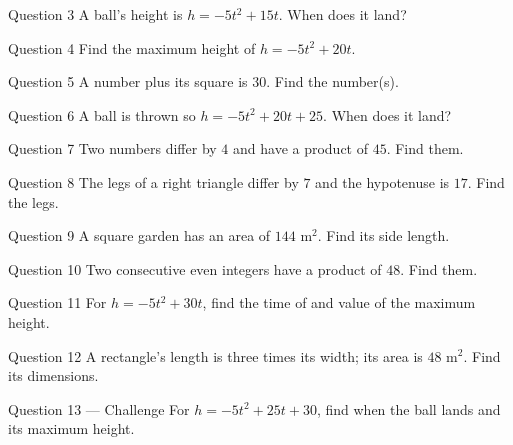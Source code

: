 \documentclass[11pt]{article}
\begin{document}
\begin{qbox}{Question 3}
A ball's height is $h=-5t^2+15t$. When does it land?\workspace{2.4cm}
\end{qbox}

\begin{qbox}{Question 4}
Find the maximum height of $h=-5t^2+20t$.\workspace{2.2cm}
\end{qbox}

\begin{qbox}{Question 5}
A number plus its square is $30$. Find the number(s).\workspace{2.4cm}
\end{qbox}

\begin{qbox}{Question 6}
A ball is thrown so $h=-5t^2+20t+25$. When does it land?\workspace{2.6cm}
\end{qbox}

\begin{qbox}{Question 7}
Two numbers differ by $4$ and have a product of $45$. Find them.\workspace{2.6cm}
\end{qbox}

\begin{qbox}{Question 8}
The legs of a right triangle differ by $7$ and the hypotenuse is $17$. Find the legs.\workspace{2.8cm}
\end{qbox}

\begin{qbox}{Question 9}
A square garden has an area of $144$ m$^2$. Find its side length.\workspace{2.2cm}
\end{qbox}

\begin{qbox}{Question 10}
Two consecutive even integers have a product of $48$. Find them.\workspace{2.4cm}
\end{qbox}

\begin{qbox}{Question 11}
For $h=-5t^2+30t$, find the time of and value of the maximum height.\workspace{2.6cm}
\end{qbox}

\begin{qbox}{Question 12}
A rectangle's length is three times its width; its area is $48$ m$^2$. Find its dimensions.\workspace{2.6cm}
\end{qbox}

\begin{qbox}{Question 13 --- Challenge}
For $h=-5t^2+25t+30$, find when the ball lands and its maximum height.\workspace{3.2cm}
\end{qbox}
\end{document}
